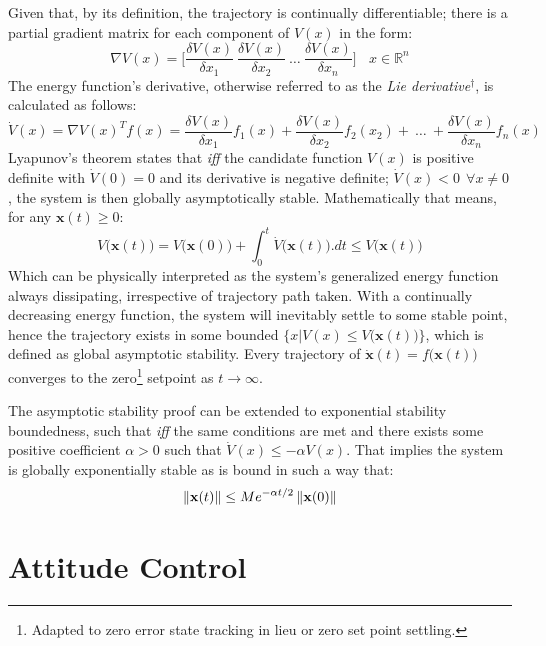 Given that, by its definition, the trajectory is continually differentiable; there is a partial gradient matrix for each component of $V(x)$ in the form:
\begin{equation}
\nabla V(x)=\bigg[\frac{\delta V(x)}{\delta x_1}~\frac{\delta V(x)}{\delta x_2}~\ldots~\frac{\delta V(x)}{\delta x_n}\bigg]~~~~x\in\mathbb{R}^n
\end{equation}
The energy function's derivative, otherwise referred to as the \emph{Lie derivative}$^\dagger$, is calculated as follows:
\begin{equation}
\dot{V}(x)=\nabla V(x)^Tf(x)=\frac{\delta V(x)}{\delta x_1}f_1(x)+\frac{\delta V(x)}{\delta x_2}f_2(x_2)+~\ldots~+\frac{\delta V(x)}{\delta x_n}f_n(x)
\end{equation}
Lyapunov's theorem states that \emph{iff} the candidate function $V(x)$ is positive definite with $\dot{V}(0)=0$ and its derivative is negative definite; $\dot{V}(x)< 0~~\forall x \not= 0$, the system is then globally asymptotically stable. Mathematically that means, for any $\mathbf{x}(t)\geq 0$:
\begin{equation}
V\big(\mathbf{x}(t)\big)=V\big(\mathbf{x}(0)\big)+\int_0^t \dot{V}\big(\mathbf{x}(t)\big).dt \leq V\big(\mathbf{x}(t)\big)
\end{equation}
Which can be physically interpreted as the system's generalized energy function always dissipating, irrespective of trajectory path taken. With a continually decreasing energy function, the system will inevitably settle to some stable point, hence the trajectory exists in some bounded $\big\{x|V(x)\leq V\big(\mathbf{x}(t)\big)\big\}$, which is defined as global asymptotic stability. Every trajectory of $\dot{\mathbf{x}}(t)=f\big(\mathbf{x}(t)\big)$ converges to the zero\footnote{Adapted to zero error state tracking in lieu or zero set point settling.} setpoint as $t\rightarrow\infty$.
\par
The asymptotic stability proof can be extended to exponential stability boundedness, such that \emph{iff} the same conditions are met and there exists some positive coefficient $\alpha>0$ such that $\dot{V}(x)\leq-\alpha V(x)$. That implies the system is globally exponentially stable as is bound in such a way that:
\begin{equation}
\left\lVert\mathbf{x}(t)\right\rVert\leq Me^{-\alpha t/2}\left\lVert\mathbf{x}(0)\right\rVert
\end{equation}
\section{Attitude Control}
\label{sec:control.attitude}
